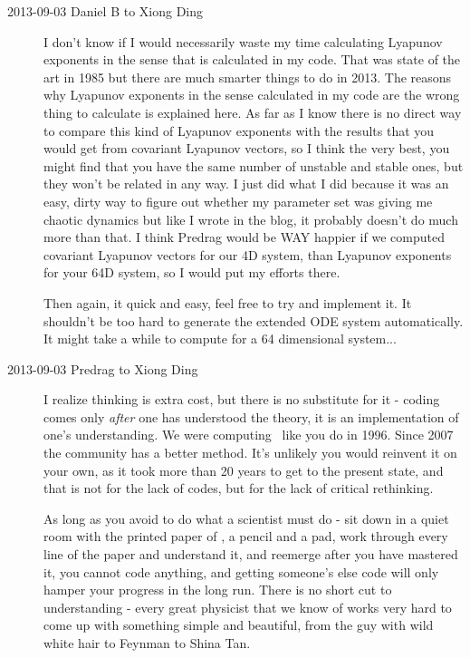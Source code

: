 \begin{description}
\item[2013-09-03 Daniel B to Xiong Ding]
I don't know if I would necessarily waste my time calculating Lyapunov exponents in the sense that is calculated in my code. That was state of the art in 1985 but there are much smarter things to do in 2013. The reasons why Lyapunov exponents in the sense calculated in my code are the wrong thing to calculate is explained   {here}. As far as I know there is no direct way to compare this kind of Lyapunov exponents with the results that you would get from covariant Lyapunov vectors, so I think the very best, you might find that you have the same number of unstable and stable ones, but they won't be related in any way. I just did what I did because it was an easy, dirty way to figure out whether my parameter set was giving me chaotic dynamics but like I wrote in the blog, it probably doesn't do much more than that. I think Predrag would be WAY happier if we computed covariant Lyapunov vectors for our 4D system, than Lyapunov exponents for your 64D system, so I would put my efforts there.

Then again, it quick and easy, feel free to try and implement it. It shouldn't be too hard to generate the extended ODE system automatically. It might take a while to compute for a 64 dimensional system...


\item[2013-09-03 Predrag to Xiong Ding]
I realize thinking is extra cost, but there is no substitute for it - coding comes only \emph{after} one has understood the theory, it is an implementation of one's understanding.
We were computing \jacobianMs\ like you do in 1996. Since
2007 the community has a better method. It's unlikely
you would reinvent it on your own, as it took more than 20 years to get to the
present state, and that is not for the lack of codes, but for the lack of critical
rethinking.

As long as you avoid to do what a scientist must do - sit down in a quiet room with the printed paper of , a pencil and a pad, work through every line of the paper and understand it, and reemerge after you have mastered it, you cannot code anything, and getting someone's else code will only hamper your progress in the long run.
There is no short cut to understanding - every great physicist that we know of
works very hard to come up with something simple and beautiful, from the guy with
wild white hair to Feynman to Shina Tan.


\end{description}
